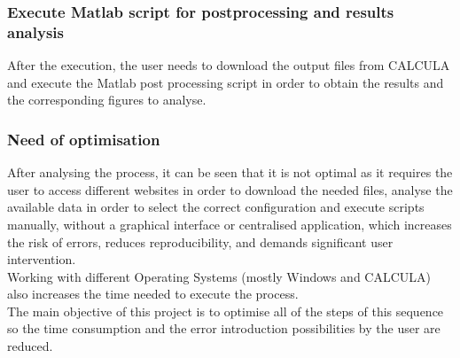 \subsubsection{Execute Matlab script for postprocessing and results analysis}
After the execution, the user needs to download the output files from CALCULA and execute the Matlab post processing script in order to obtain the results and the corresponding figures to analyse.
\subsubsection{Need of optimisation}
After analysing the process, it can be seen that it is not optimal as it requires the user to access different websites in order to download the needed files, analyse the available data in order to select the correct configuration and execute scripts manually, without a graphical interface or centralised application, which increases the risk of errors, reduces reproducibility, and demands significant user intervention.
\smallskip\\Working with different Operating Systems (mostly Windows and CALCULA) also increases the time needed to execute the process.
\smallskip\\The main objective of this project is to optimise all of the steps of this sequence so the time consumption and the error introduction possibilities by the user are reduced. 